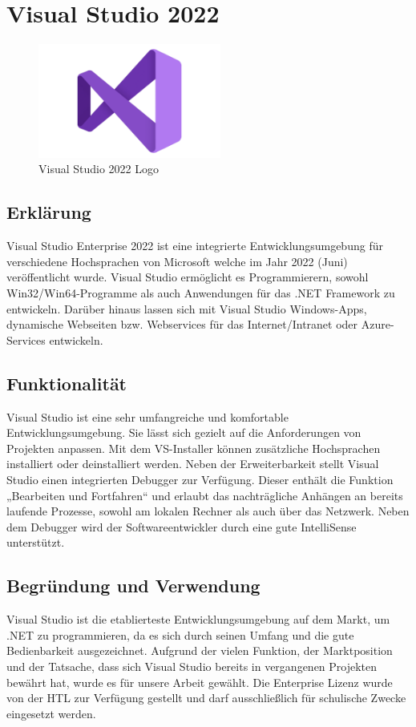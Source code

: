 \section{Visual Studio 2022}
\author{Mirzet sakonjic}
\cite{VS2022}
\begin{figure}[h]
    \begin{center}
        \includegraphics*[width=6cm]{pics/Visual-Studio-Logo.png}
        \caption[VS 2022 Logo]{Visual Studio 2022 Logo \cite{VS2022logo}}
    \end{center}
\end{figure}
\subsection*{Erklärung}
Visual Studio Enterprise 2022 ist eine integrierte Entwicklungsumgebung für verschiedene Hochsprachen von Microsoft welche im Jahr 2022 (Juni) veröffentlicht wurde.
Visual Studio ermöglicht es Programmierern, sowohl Win32/Win64-Programme als
auch Anwendungen für das .NET Framework zu entwickeln. Darüber hinaus lassen sich
mit Visual Studio Windows-Apps, dynamische Webseiten bzw. Webservices für das
Internet/Intranet oder Azure-Services entwickeln.
\subsection*{Funktionalität}
Visual Studio ist eine sehr umfangreiche und komfortable Entwicklungsumgebung. Sie
lässt sich gezielt auf die Anforderungen von Projekten anpassen. Mit dem VS-Installer
können zusätzliche Hochsprachen installiert oder deinstalliert werden.
Neben der Erweiterbarkeit stellt Visual Studio einen integrierten Debugger zur Verfügung. Dieser enthält die Funktion „Bearbeiten und Fortfahren“ und erlaubt das
nachträgliche Anhängen an bereits laufende Prozesse, sowohl am lokalen Rechner als
auch über das Netzwerk. Neben dem Debugger wird der Softwareentwickler durch eine
gute IntelliSense unterstützt.
\subsection*{Begründung und Verwendung}
Visual Studio ist die etablierteste Entwicklungsumgebung auf dem Markt, um .NET
zu programmieren, da es sich durch seinen Umfang und die gute Bedienbarkeit ausgezeichnet. Aufgrund der vielen Funktion, der Marktposition und der Tatsache, dass
sich Visual Studio bereits in vergangenen Projekten bewährt hat, wurde es für unsere
Arbeit gewählt. Die Enterprise Lizenz wurde von der HTL zur Verfügung gestellt und
darf ausschließlich für schulische Zwecke eingesetzt werden.
\newpage

